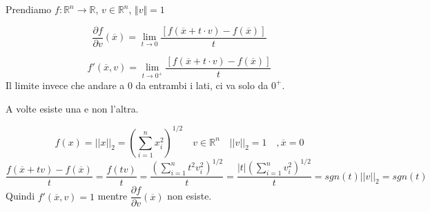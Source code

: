 Prendiamo $ f: \mathbb{R}^{n} \rightarrow  \mathbb{R}$, $v \in \mathbb{R}^n$, $\Vert v \Vert = 1$

\begin{defn}
$$\dfrac{\partial f}{\partial v}(\overline{x}) = \lim_{t \to 0} \dfrac{[f(\overline{x}+t \cdot v)-f(\overline{x})]}{t}$$
\end{defn}

\begin{defn}
$$f'(\overline{x}, v) = \lim_{t \to 0^{+}} \dfrac{[f(\overline{x}+t \cdot v)-f(\overline{x})]}{t}$$
Il limite invece che andare a $0$ da entrambi i lati, ci va solo da $0^+$.
\end{defn}

\begin{notes}
A volte esiste una e non l'altra.
\end{notes}

\begin{example}
 $$f(x) = || x ||_2 = ( \displaystyle \sum_{i=1}^{n} x_i^2)^{1/2} \quad
 v \in \mathbb{R}^{n} \quad ||v||_{2} = 1 \quad, \overline{x} = 0
 $$
$$  \frac{f(\overline{x} + tv) - f(\overline{x})}{t} = \frac{f(tv)}{t} = 
\frac{( \displaystyle \sum_{i=1}^{n} t^{2}v_{i}^{2})^{1/2}}{t} = 
\frac{|t| (\displaystyle \sum_{i=1}^{n} v_i^{2})^{1/2}}{t} =sgn(t) ||v||_{2} = sgn(t) 
$$
Quindi $f'(\overline{x}, v) = 1$ mentre $\dfrac{\partial f}{\partial v}(\overline{x})$ non esiste.
\end{example}

